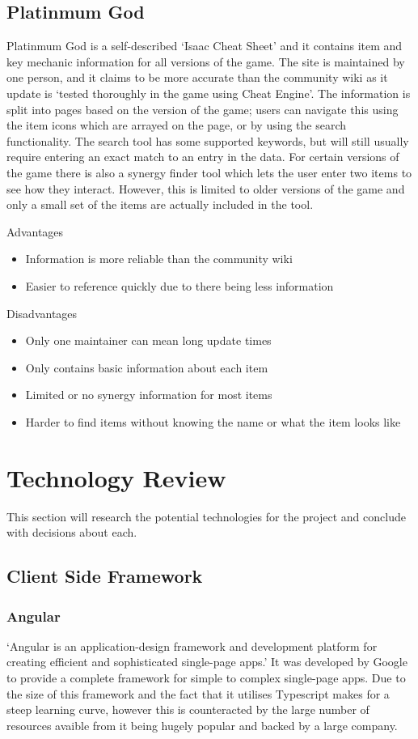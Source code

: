 \subsection*{Platinmum God}
Platinmum God is a self-described `Isaac Cheat Sheet'\cite{IsaacCheatSheet} and it contains item and key mechanic 
information for all versions of the game. The site is maintained by one person, and it claims to be more accurate than 
the community wiki as it update is `tested thoroughly in the game using Cheat Engine'\cite{FrequentlyAskedQuestions}. 
The information is split into pages based on the version of the game; users can navigate this using the item icons which
 are arrayed on the page, or by using the search functionality. The search tool has some supported keywords, but will 
still usually require entering an exact match to an entry in the data. For certain versions of the game there is also a 
synergy finder tool which lets the user enter two items to see how they interact. However, this is limited to older 
versions of the game and only a small set of the items are actually included in the tool. \par
Advantages
\begin{itemize}
    \item Information is more reliable than the community wiki
    \item Easier to reference quickly due to there being less information
\end{itemize}
Disadvantages
\begin{itemize}
    \item Only one maintainer can mean long update times
    \item Only contains basic information about each item
    \item Limited or no synergy information for most items
    \item Harder to find items without knowing the name or what the item looks like
\end{itemize}
\section{Technology Review}
This section will research the potential technologies for the project and conclude with decisions about each.
\subsection{Client Side Framework}
\subsubsection*{Angular}
`Angular is an application-design framework and development platform for creating efficient and sophisticated 
single-page apps.'\cite{AngularIntroductionAngular} It was developed by Google to provide a complete framework for 
simple to complex single-page apps. Due to the size of this framework and the fact that it utilises Typescript makes for
 a steep learning curve, however this is counteracted by the large number of resources avaible from it being hugely 
popular and backed by a large company.
